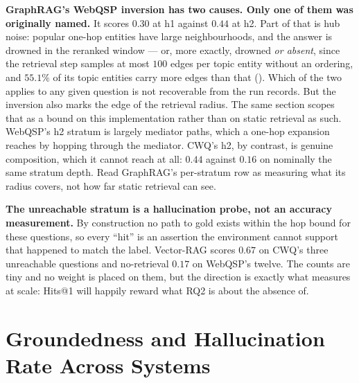 \textbf{GraphRAG's WebQSP inversion has two causes. Only one of them was
originally named.} It scores $0.30$ at \textsf{h1} against $0.44$ at
\textsf{h2}. Part of that is hub noise: popular one-hop entities have large
neighbourhoods, and the answer is drowned in the reranked window --- or, more
exactly, drowned \emph{or absent}, since the retrieval step samples at most
$100$ edges per topic entity without an ordering, and $55.1\%$ of its topic
entities carry more edges than that (). Which of the
two applies to any given question is not recoverable from the run records. But
the inversion also marks the edge of the retrieval radius. The same
section scopes that as a bound on this implementation rather than on static
retrieval as such. WebQSP's \textsf{h2} stratum is largely mediator paths, which
a one-hop expansion reaches by hopping through the mediator. CWQ's \textsf{h2},
by contrast, is genuine composition, which it cannot reach at all: $0.44$
against $0.16$ on nominally the same stratum depth. Read GraphRAG's per-stratum
row as measuring what its radius covers, not how far static retrieval can see.

\textbf{The unreachable stratum is a hallucination probe, not an accuracy
measurement.} By construction no path to gold exists within the hop bound for
these questions, so every ``hit'' is an assertion the environment cannot support
that happened to match the label. Vector-RAG scores $0.67$ on CWQ's three
unreachable questions and no-retrieval $0.17$ on WebQSP's twelve. The counts are
tiny and no weight is placed on them, but the direction is exactly what
 measures at scale: Hits@1 will happily reward
what RQ2 is about the absence of.

\section{Groundedness and Hallucination Rate Across
Systems}\label{sec:groundedness-results}

